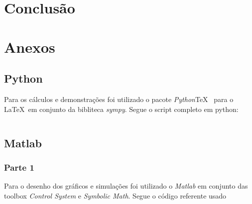 \documentclass[a4paper,11pt]{article}
\begin{document}
\section{Conclusão}





\newpage

\nocite{sympy}
\nocite{pythontex}
\nocite{matlabcontrol}
\nocite{matlabsymbolic}
\nocite{ogata2010modern}

\newpage
\section*{Anexos}
\subsection*{Python}

Para os cálculos e demonstrações foi utilizado o pacote \textit{Python}\TeX\ \cite{pythontex} para o \LaTeX\ em conjunto da bibliteca \textit{sympy}\cite{sympy}. Segue o script completo em python:

\inputminted[xleftmargin=15pt,linenos,frame=single,framesep=5pt,breaklines=true]{python}{../python/exsim6.py}

\newpage
\subsection*{Matlab}

\subsubsection*{Parte 1}
Para o desenho dos gráficos e simulações foi utilizado o \textit{Matlab} em conjunto das toolbox \textit{Control System}\cite{matlabcontrol} e \textit{Symbolic Math}\cite{matlabsymbolic}. Segue o código referente usado

\inputminted[xleftmargin=15pt,linenos,frame=single,framesep=5pt,breaklines=true]{matlab}{../matlab/exsim6/exsim6.m}


\end{document}
